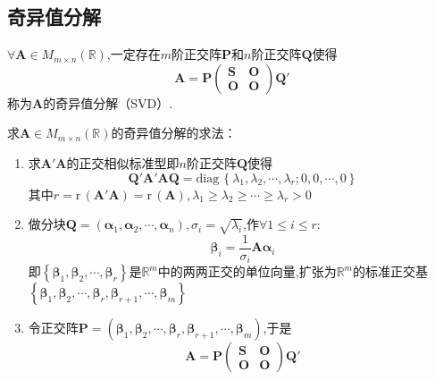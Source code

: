 \subsection{奇异值分解}
\begin{formal}
    \begin{definition}[奇异值分解]\label{def:奇异值分解}
        $\forall\bm{A}\in M_{m\times n}\left(\mathbb{R}\right)$,一定存在$m$阶正交阵$\bm{P}$和$n$阶正交阵$\bm{Q}$使得\[
        \bm{A}=\bm{P}\begin{pmatrix}
            \bm{S}&\bm{O}\\
            \bm{O}&\bm{O}
        \end{pmatrix}\bm{Q}'
        \]称为$\bm{A}$的奇异值分解（SVD）.
    \end{definition}
\end{formal}
\begin{red}
    \begin{remark}
        求$\bm{A}\in M_{m\times n}\left(\mathbb{R}\right)$的奇异值分解的求法：\begin{enumerate}[label=\textup{(\arabic*)}]
            \item 求$\bm{A}'\bm{A}$的正交相似标准型即$n$阶正交阵$\bm{Q}$使得\[
            \bm{Q}'\bm{A}'\bm{AQ}=\mathrm{diag}\,\left\{
                \lambda_1,\lambda_2,\cdots,\lambda_r;0,0,\cdots,0
            \right\}
            \]其中$r=\mathrm{r}\,\left(\bm{A}'\bm{A}\right)=\mathrm{r}\,\left(\bm{A}\right),\lambda_1\geqslant\lambda_2\geqslant\cdots\geqslant\lambda_r>0$
            \item 做分块$\bm{Q}=\left(
                \bm{\alpha}_1,\bm{\alpha}_2,\cdots,\bm{\alpha}_n
            \right),\sigma_i=\sqrt{\lambda_i}$,作$\forall1\leqslant i\leqslant r:$\[
            \bm{\beta}_i=\frac{1}{\sigma_i}\bm{A}\bm{\alpha}_i
            \]即$\left\{
                \bm{\beta}_1,\bm{\beta}_2,\cdots,\bm{\beta}_r
            \right\}$是$\mathbb{R}^m$中的两两正交的单位向量,扩张为$\mathbb{R}^m$的标准正交基$\left\{
                \bm{\beta}_1,\bm{\beta}_2,\cdots,\bm{\beta}_r,\bm{\beta}_{r+1},\cdots,\bm{\beta}_m
            \right\}$
            \item 令正交阵$\bm{P}=\left(
                \bm{\beta}_1,\bm{\beta}_2,\cdots,\bm{\beta}_r,
                \bm{\beta}_{r+1},\cdots,\bm{\beta}_m
            \right)$,于是\[
            \bm{A}=\bm{P}\begin{pmatrix}
                \bm{S}&\bm{O}\\
                \bm{O}&\bm{O}
            \end{pmatrix}\bm{Q}'
            \]
        \end{enumerate}
    \end{remark}
\end{red}

